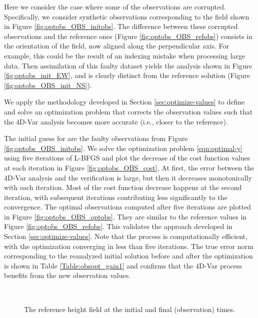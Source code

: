 \documentclass{article}
\begin{document}
Here we consider the case where some of the observations 
are corrupted. Specifically, we consider synthetic observations corresponding to the field
shown in Figure \ref{fig:optobs_OBS_initobs}. The difference between these corrupted
observations and the reference ones (Figure \ref{fig:optobs_OBS_refobs})
 consists in the orientation of the field, now aligned along the perpendicular axis. 
For example, this could be the result of an indexing mistake when processing large data.
Then assimilation of this faulty dataset yields the  analysis shown in Figure \ref{fig:optobs_init_EW}, 
and is clearly distinct from the reference solution (Figure \ref{fig:optobs_OBS_init_NS}).

We apply the methodology developed in Section \ref{sec:optimize-values} to define and solve an 
optimization problem that corrects the observation values  such that the 4D-Var analysis becomes 
more accurate (i.e., closer to the reference).

The initial guess for  are the faulty observations from Figure \ref{fig:optobs_OBS_initobs}.
We solve the optimization problem \eqref{eqn:optimal-y} using five iterations of L-BFGS \cite{zhu1997algorithm} 
and plot the decrease of the cost function values  at each iteration in Figure \ref{fig:optobs_OBS_cost},
At first, the error between the 4D-Var analysis and the verification is large,
but then it decreases monotonically with each iteration.
Most of the cost function decrease happens at the second iteration,
with subsequent iterations contributing less significantly to the convergence.
The optimal observations computed after five iterations are plotted in Figure \ref{fig:optobs_OBS_optobs}.
They are similar to the reference values in Figure \ref{fig:optobs_OBS_refobs}. This validates the approach developed
in Section \ref{sec:optimize-values}. Note that the process is computationally efficient, with the optimization
converging in less than five iterations.
The true error norm corresponding to the reanalyzed initial solution  before and after the optimization 
is shown in Table \ref{Table:obsopt_gain1} and confirms that the 4D-Var process benefits from the new observation values.

\begin{figure}
\setcounter{subfigure}{0}
\centering
  \\
 \caption{The reference height field  at the initial and final (observation) times.}
\end{figure}
\end{document}
